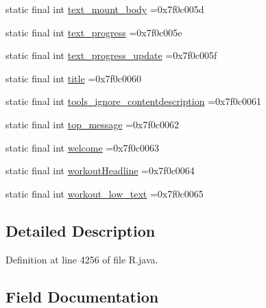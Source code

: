 \begin{DoxyCompactItemize}
\item 
static final int \mbox{\hyperlink{classcom_1_1example_1_1trainawearapplication_1_1_r_1_1string_af26e7a67bc7f87776077b2556272375c}{text\+\_\+mount\+\_\+body}} =0x7f0c005d
\item 
static final int \mbox{\hyperlink{classcom_1_1example_1_1trainawearapplication_1_1_r_1_1string_a3ec499b259b1a88285c25fa8bd4845a8}{text\+\_\+progress}} =0x7f0c005e
\item 
static final int \mbox{\hyperlink{classcom_1_1example_1_1trainawearapplication_1_1_r_1_1string_a491ed7a84403289cf7e65828f1f6c41e}{text\+\_\+progress\+\_\+update}} =0x7f0c005f
\item 
static final int \mbox{\hyperlink{classcom_1_1example_1_1trainawearapplication_1_1_r_1_1string_ab8a72ccdfedc51e0f212851f30f4bac8}{title}} =0x7f0c0060
\item 
static final int \mbox{\hyperlink{classcom_1_1example_1_1trainawearapplication_1_1_r_1_1string_a461c8f359916f76cb3b083b483c6d866}{tools\+\_\+ignore\+\_\+contentdescription}} =0x7f0c0061
\item 
static final int \mbox{\hyperlink{classcom_1_1example_1_1trainawearapplication_1_1_r_1_1string_adbcbe114be0da7b15dfc49e7a5d4aa98}{top\+\_\+message}} =0x7f0c0062
\item 
static final int \mbox{\hyperlink{classcom_1_1example_1_1trainawearapplication_1_1_r_1_1string_a66c7d74bd8a8f7eebbe43f042a1c1548}{welcome}} =0x7f0c0063
\item 
static final int \mbox{\hyperlink{classcom_1_1example_1_1trainawearapplication_1_1_r_1_1string_abf8bce5fc2a7b055f6d5404aa451d626}{workout\+Headline}} =0x7f0c0064
\item 
static final int \mbox{\hyperlink{classcom_1_1example_1_1trainawearapplication_1_1_r_1_1string_aa5cfc5ea069b47aec4828642065a29b6}{workout\+\_\+low\+\_\+text}} =0x7f0c0065
\end{DoxyCompactItemize}


\subsection{Detailed Description}


Definition at line 4256 of file R.\+java.



\subsection{Field Documentation}
\mbox{\label{classcom_1_1example_1_1trainawearapplication_1_1_r_1_1string_aefbaa1c8972461a189212a1e00620ae7}} 
